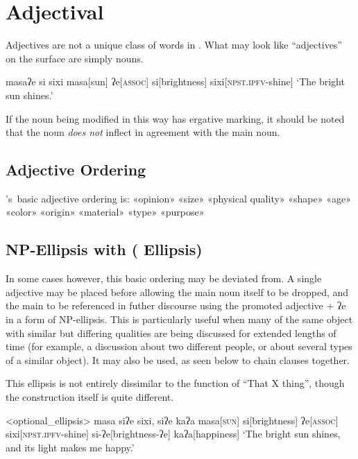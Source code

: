 \chapter{Adjectival}\label{ch:adjectives}
Adjectives are not a unique class of words in \langname . What may look like ``adjectives'' on the surface are simply nouns.

\ex
\begingl
\glpreamble masaʔe si sixi
\endpreamble
\nogloss{\lbrack}
masa[sun]
ʔe[\textsc{assoc}]
si[brightness]
\nogloss{\rbrack}
sixi[\textsc{npst.ipfv}-shine]
\glft `The bright sun shines.'
\endgl
\xe

If the noun being modified in this way has ergative marking, it should be noted that the noun \textit{does not} inflect in agreement with the main noun.

\section{Adjective Ordering}

\langname 's\ basic adjective ordering is: «opinion» «size» «physical quality» «shape» «age» «color» «origin» «material» «type» «purpose»

\section{NP-Ellipsis with  ( Ellipsis)}

In some cases however, this basic ordering may be deviated from. A single adjective may be placed before  allowing the main noun itself to be dropped, and the main to be referenced in futher discourse using the promoted adjective + ʔe in a form of NP-ellipsis. This is particularly useful when many of the same object with similar but differing qualities are being discussed for extended lengths of time (for example, a discussion about two different people, or about several types of a similar object). It may also be used, as seen below to chain clauses together.

This ellipsis is not entirely dissimilar to the function of ``That X thing'', though the construction itself is quite different.


\ex<optional_ellipsis>
\begingl
\glpreamble masa siʔe sixi, siʔe kaʔa
\endpreamble
\nogloss{\lbrack}
masa[\textsc{sun}]
si[brightness]
ʔe[\textsc{assoc}]
\nogloss{\rbrack}
sixi[\textsc{npst.ipfv}-shine]
si-ʔe[brightness-ʔe]
kaʔa[happiness]
\glft `The bright sun shines, and its light makes me happy.'
\endgl
\xe

